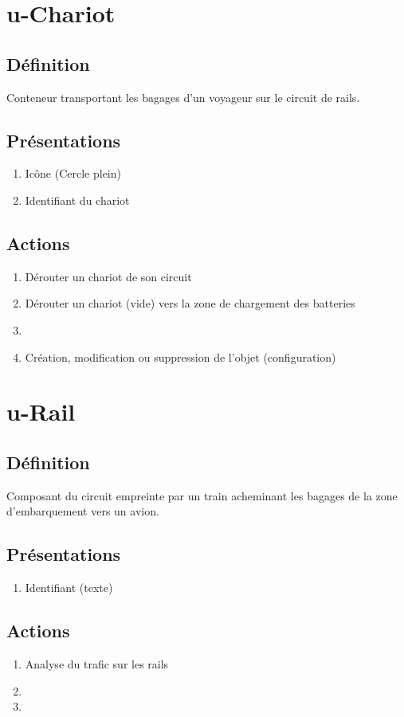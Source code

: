 \section{u-Chariot}
\subsection{Définition}
	Conteneur transportant les bagages d'un voyageur sur le circuit de rails.
\subsection{Présentations}
\begin{enumerate}
	\item Icône (Cercle plein)
	\item Identifiant du chariot
\end{enumerate}

\subsection{Actions}
\begin{enumerate}
	\item Dérouter un chariot de son circuit
	\item Dérouter un chariot (vide) vers la zone de chargement des batteries
	\item \etat
	\item Création, modification ou suppression de l'objet (configuration)
\end{enumerate}

\section{u-Rail}
\subsection{Définition}
	Composant du circuit empreinte par un train acheminant les bagages de la zone d'embarquement vers un avion.

\subsection{Présentations}
\begin{enumerate}
	\item Identifiant (texte)
\end{enumerate}

\subsection{Actions}
\begin{enumerate}
	\item Analyse du trafic sur les rails
	\item \etat 
	\item {}
\end{enumerate}


